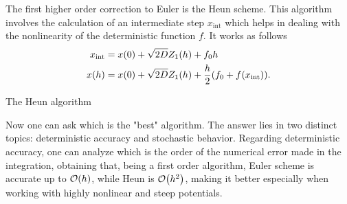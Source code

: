 \documentclass[../../master_thesis_np.tex]{subfiles}
\begin{document}
		The first higher order correction to Euler is the Heun scheme. This algorithm involves the calculation of an intermediate step $x_{\text{int}}$ which helps in dealing with the nonlinearity of the deterministic function $f$. It works as follows
		\begin{equation}
			\begin{aligned}
				x_{\text{int}} &= x(0) + \sqrt{2D} Z_1(h) + f_0 h\\
				x(h) &= x(0) + \sqrt{2D} Z_1(h) + \frac{h}{2} \qty(f_0 + f(x_{\text{int}})).
			\end{aligned}
		\end{equation}
		
		\begin{algorithm}
			\caption{The Heun algorithm} \label{alg:heun}	
			\begin{algorithmic}[1]
				\EndFor
				\EndFor
			\end{algorithmic}
		\end{algorithm}
		Now one can ask which is the "best" algorithm. The answer lies in two distinct topics: deterministic accuracy and stochastic behavior. Regarding deterministic accuracy, one can analyze which is the order of the numerical error made in the integration, obtaining that, being a first order algorithm, Euler scheme is accurate up to $\order{h}$, while Heun is $\order{h^2}$, making it better especially when working with highly nonlinear and steep potentials.
		
\end{document}
